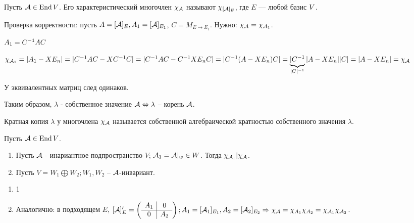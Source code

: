 \documentclass[main]{subfiles}
\begin{document}
\begin{definition}
    Пусть $\mathcal{A} \in \operatorname{End} V$. Его характеристический многочлен $\chi_{\mathcal{A}}$ называют
    $\chi_{[\mathcal{A}]_E}$, где $E$  — любой базис $V$.
\end{definition}

Проверка корректности: пусть $A = [\mathcal{A}]_E, A_1 = [\mathcal{A}]_{E_1}$,
$C = M_{E \rightarrow E_1}$. Нужно: $\chi_{\mathcal{A}} = \chi_{\mathcal{A}_1}$.

$A_1 = C^{-1}A C$

$\chi_{\mathcal{A}_1} = |A_1 - X E_n| =
    |C^{-1}A C - XC^{-1}C| = |C^{-1}A C - C^{-1}XE_nC| =
    |C^{-1}(A - XE_n) C| = \underbrace{|C^{-1}}_{|C|^{-1}}|A - XE_n||C| =
    |A - XE_n| = \chi_{\mathcal{A}}$

У эквивалентных матриц след одинаков.

Таким образом, $\lambda$ - собственное значение $\mathcal{A} \Leftrightarrow \lambda$
-- корень $\mathcal{A}$.

\begin{definition}
    Кратная копия $\lambda$ у многочлена $\chi_{\mathcal{A}}$ называется собственной алгебраической кратностью собственного значения $\lambda$.
\end{definition}

\begin{proposition}
    Пусть $\mathcal{A} \in \operatorname{End} V$.
    \begin{enumerate}
        \item Пусть $\mathcal{A}$ - инариантное подпространство $V$; $\mathcal{A}_1 = \mathcal{A}|_w \in W$. Тогда $\chi_{\mathcal{A}_1} | \chi_{\mathcal{A}}$.
        \item Пусть $V = W_1 \bigoplus W_2; W_1, W_2$ -- $\mathcal{A}$-инвариант.
    \end{enumerate}

\end{proposition}

\begin{definition}
    \begin{enumerate}
        \item 1
        \item Аналогично: в подходящем $E$, $[\mathcal{A}]'_E = \left(\begin{array}{c|c}
                          A_1 & 0   \\ \hline
                          0   & A_2 \\
                      \end{array}\right); A_1 = [\mathcal{A}_1]_{E_1}, A_2 = [\mathcal{A}_2]_{E_2} \Rightarrow
                  \chi_{\mathcal{A}} = \chi_{A_1}\chi_{A_2}= \chi_{\mathcal{A}_1}\chi_{\mathcal{A}_2}$.
    \end{enumerate}
\end{definition}
\end{document}
